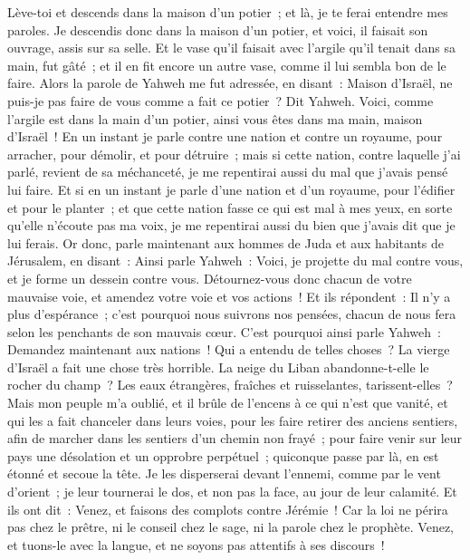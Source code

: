 \begin{multicols}{2}
Lève-toi et descends dans la maison d'un potier~; et là, je te ferai entendre mes paroles.
Je descendis donc dans la maison d'un potier, et voici, il faisait son ouvrage, assis sur sa selle.
Et le vase qu'il faisait avec l'argile qu'il tenait dans sa main, fut gâté~; et il en fit encore un autre vase, comme il lui sembla bon de le faire.
Alors la parole de Yahweh me fut adressée, en disant~:
Maison d'Israël, ne puis-je pas faire de vous comme a fait ce potier~? Dit Yahweh. Voici, comme l'argile est dans la main d'un potier, ainsi vous êtes dans ma main, maison d'Israël~!
En un instant je parle contre une nation et contre un royaume, pour arracher, pour démolir, et pour détruire~;
mais si cette nation, contre laquelle j'ai parlé, revient de sa méchanceté, je me repentirai aussi du mal que j'avais pensé lui faire.
Et si en un instant je parle d'une nation et d'un royaume, pour l'édifier et pour le planter~;
 et que cette nation fasse ce qui est mal à mes yeux, en sorte qu'elle n'écoute pas ma voix, je me repentirai aussi du bien que j'avais dit que je lui ferais.
Or donc, parle maintenant aux hommes de Juda et aux habitants de Jérusalem, en disant~: Ainsi parle Yahweh~: Voici, je projette du mal contre vous, et je forme un dessein contre vous. Détournez-vous donc chacun de votre mauvaise voie, et amendez votre voie et vos actions~!
Et ils répondent~: Il n'y a plus d'espérance~; c'est pourquoi nous suivrons nos pensées, chacun de nous fera selon les penchants de son mauvais cœur.
C'est pourquoi ainsi parle Yahweh~: Demandez maintenant aux nations~! Qui a entendu de telles choses~? La vierge d'Israël a fait une chose très horrible.
La neige du Liban abandonne-t-elle le rocher du champ~? Les eaux étrangères, fraîches et ruisselantes, tarissent-elles~?
Mais mon peuple m'a oublié, et il brûle de l'encens à ce qui n'est que vanité, et qui les a fait chanceler dans leurs voies, pour les faire retirer des anciens sentiers, afin de marcher dans les sentiers d'un chemin non frayé~;
pour faire venir sur leur pays une désolation et un opprobre perpétuel~; quiconque passe par là, en est étonné et secoue la tête.
Je les disperserai devant l'ennemi, comme par le vent d'orient~; je leur tournerai le dos, et non pas la face, au jour de leur calamité.
Et ils ont dit~: Venez, et faisons des complots contre Jérémie~! Car la loi ne périra pas chez le prêtre, ni le conseil chez le sage, ni la parole chez le prophète. Venez, et tuons-le avec la langue, et ne soyons pas attentifs à ses discours~!

\end{multicols}
